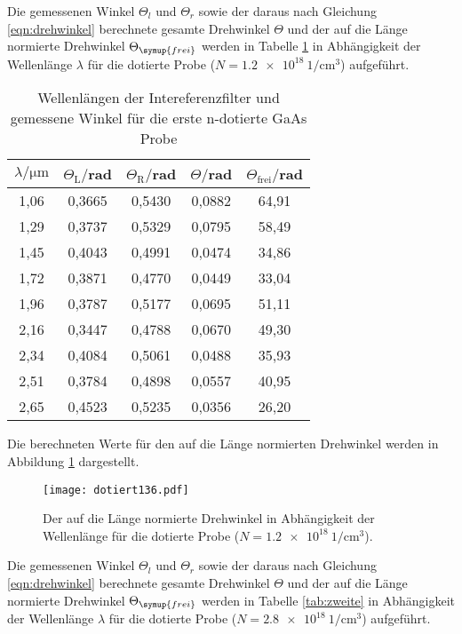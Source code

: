 Die gemessenen Winkel $\Theta_l$ und $\Theta_r$ sowie der daraus nach Gleichung
\ref{eqn:drehwinkel} berechnete gesamte Drehwinkel $\Theta$ und der auf die Länge
normierte Drehwinkel $\Theta_\symup{frei}$ werden in Tabelle \ref{tab:erste} in Abhängigkeit
der Wellenlänge $\lambda$ für die dotierte Probe ($N = \SI{1.2e18}{1\per\centi\meter^3}$) aufgeführt.

\begin{table}[H]
  \centering
  \caption{Wellenlängen der Intereferenzfilter und gemessene Winkel für die erste n-dotierte GaAs Probe}
  \label{tab:erste}
  \begin{tabular}{c c c c c}
    \toprule
    $\lambda/\mathrm{\mu m}$ & $\Theta_{\mathrm{L}}/$rad & $\Theta_{\mathrm{R}}/$rad  & $\Theta /$rad & $\Theta_{\mathrm{frei}}/$rad\\
    \midrule
    1,06  & 0,3665 & 0,5430 & 0,0882 & 64,91 \\
    1,29  & 0,3737 & 0,5329 & 0,0795 & 58,49 \\
    1,45  & 0,4043 & 0,4991 & 0,0474 & 34,86 \\
    1,72  & 0,3871 & 0,4770 & 0,0449 & 33,04 \\
    1,96  & 0,3787 & 0,5177 & 0,0695 & 51,11 \\
    2,16  & 0,3447 & 0,4788 & 0,0670 & 49,30 \\
    2,34  & 0,4084 & 0,5061 & 0,0488 & 35,93 \\
    2,51  & 0,3784 & 0,4898 & 0,0557 & 40,95 \\
    2,65  & 0,4523 & 0,5235 & 0,0356 & 26,20 \\
    \bottomrule
  \end{tabular}
\end{table}



Die berechneten Werte für den auf die Länge normierten Drehwinkel werden
in Abbildung \ref{fig:rein} dargestellt.
\begin{figure}[H]
  \centering
  \texttt{[image: dotiert136.pdf]}
  \caption{Der auf die Länge normierte Drehwinkel in Abhängigkeit der Wellenlänge für die dotierte Probe ($N = \SI{1.2e18}{1\per\centi\meter^3}$).}
  \label{fig:rein}
\end{figure}

Die gemessenen Winkel $\Theta_l$ und $\Theta_r$ sowie der daraus nach Gleichung
\ref{eqn:drehwinkel} berechnete gesamte Drehwinkel $\Theta$ und der auf die Länge
normierte Drehwinkel $\Theta_\symup{frei}$ werden in Tabelle \ref{tab:zweite} in Abhängigkeit
der Wellenlänge $\lambda$ für die dotierte Probe ($N = \SI{2.8e18}{1\per\centi\meter^3}$) aufgeführt.

